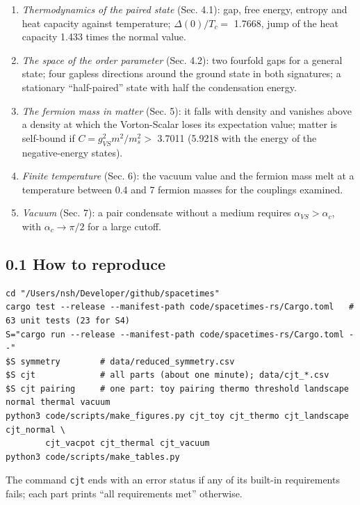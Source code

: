 \documentclass[
  10pt,
]{article}
\providecommand{\tightlist}{%
  \setlength{\itemsep}{0pt}\setlength{\parskip}{0pt}}
\begin{document}
\begin{enumerate}
\def\labelenumi{\arabic{enumi}.}
\tightlist
\item
  \emph{Thermodynamics of the paired state} (Sec. 4.1): gap, free
  energy, entropy and heat capacity against temperature;
  \(\Delta(0)/T_c=\) 1.7668, jump of the heat capacity 1.433 times the
  normal value.
\item
  \emph{The space of the order parameter} (Sec. 4.2): two fourfold gaps
  for a general state; four gapless directions around the ground state
  in both signatures; a stationary ``half-paired'' state with half the
  condensation energy.
\item
  \emph{The fermion mass in matter} (Sec. 5): it falls with density and
  vanishes above a density at which the Vorton-Scalar loses its
  expectation value; matter is self-bound if \(C=g_{VS}^2m^2/m_s^2>\)
  3.7011 (5.9218 with the energy of the negative-energy states).
\item
  \emph{Finite temperature} (Sec. 6): the vacuum value and the fermion
  mass melt at a temperature between 0.4 and 7 fermion masses for the
  couplings examined.
\item
  \emph{Vacuum} (Sec. 7): a pair condensate without a medium requires
  \(\alpha_{VS}>\alpha_c\), with \(\alpha_c\to\pi/2\) for a large
  cutoff.
\end{enumerate}

\hypertarget{how-to-reproduce}{%
\subsection{0.1 How to reproduce}\label{how-to-reproduce}}

\begin{verbatim}
cd "/Users/nsh/Developer/github/spacetimes"
cargo test --release --manifest-path code/spacetimes-rs/Cargo.toml   # 63 unit tests (23 for S4)
S="cargo run --release --manifest-path code/spacetimes-rs/Cargo.toml --"
$S symmetry        # data/reduced_symmetry.csv
$S cjt             # all parts (about one minute); data/cjt_*.csv
$S cjt pairing     # one part: toy pairing thermo threshold landscape normal thermal vacuum
python3 code/scripts/make_figures.py cjt_toy cjt_thermo cjt_landscape cjt_normal \
        cjt_vacpot cjt_thermal cjt_vacuum
python3 code/scripts/make_tables.py
\end{verbatim}

The command \texttt{cjt} ends with an error status if any of its
built-in requirements fails; each part prints ``all requirements met''
otherwise.
\end{document}
